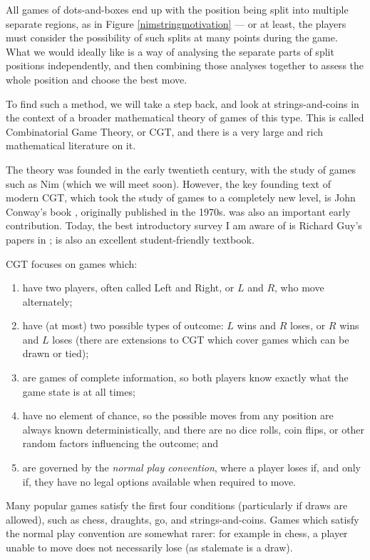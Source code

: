 \documentclass[a4paper,twocolumn]{article}
\begin{document}
All games of dots-and-boxes end up with the position being split into
multiple separate regions, as in Figure \ref{nimstringmotivation} ---
or at least, the players must consider the possibility of such splits
at many points during the game. What we would ideally like is a way of
analysing the separate parts of split positions independently, and
then combining those analyses together to assess the whole position
and choose the best move.

To find such a method, we will take a step back, and look at
strings-and-coins in the context of a broader mathematical theory of
games of this type. This is called Combinatorial Game Theory,
or CGT, and there is a very large and rich mathematical literature on
it.

The theory was founded in the early twentieth century, with the study
of games such as Nim (which we will meet soon). However, the key
founding text of modern CGT, which took the study of games to a
completely new level, is John Conway's book \cite{onag}, originally
published in the 1970s. \cite{wways} was also an important early
contribution. Today, the best introductory survey I am aware of is
Richard Guy's papers in \cite{nochance}; \cite{lip} is also an
excellent student-friendly textbook.

CGT focuses on games which:

\begin{enumerate}
  \item have two players, often called Left and Right, or $L$ and $R$,
    who move alternately;
  \item have (at most) two possible types of outcome: $L$ wins and $R$
    loses, or $R$ wins and $L$ loses (there are extensions to CGT
    which cover games which can be drawn or tied);
  \item are games of complete information, so both players know
    exactly what the game state is at all times;
  \item have no element of chance, so the possible moves from any
    position are always known deterministically, and there are no dice
    rolls, coin flips, or other random factors influencing the
    outcome; and
  \item are governed by the \emph{normal play convention}, where a
    player loses if, and only if, they have no legal options available
    when required to move.
\end{enumerate}

Many popular games satisfy the first four conditions (particularly if
draws are allowed), such as chess, draughts, go, and
strings-and-coins. Games which satisfy the normal play convention are
somewhat rarer: for example in chess, a player unable to move does not
necessarily lose (as stalemate is a draw).
\end{document}
